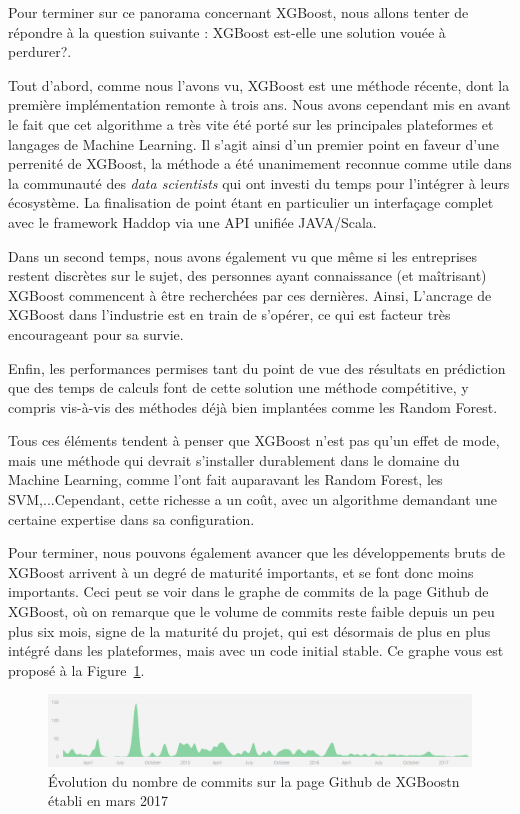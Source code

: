 Pour terminer sur ce panorama concernant XGBoost, nous allons tenter de répondre à la question suivante : \og XGBoost est-elle une solution vouée à perdurer?\fg.

Tout d'abord, comme nous l'avons vu, XGBoost est une méthode récente, dont la première implémentation remonte à trois ans. Nous avons cependant mis en avant le fait que cet algorithme a très vite été porté sur les principales plateformes et langages de Machine Learning. Il s'agit ainsi d'un premier point en faveur d'une perrenité de XGBoost, la méthode a été unanimement reconnue comme utile dans la communauté des \textit{data scientists} qui ont investi du temps pour l'intégrer à leurs écosystème. La finalisation de point étant en particulier un interfaçage complet avec le framework Haddop via une API unifiée JAVA/Scala.

Dans un second temps, nous avons également vu que même si les entreprises restent discrètes sur le sujet, des personnes ayant connaissance (et maîtrisant) XGBoost commencent à être recherchées par ces dernières. Ainsi, L'ancrage de XGBoost dans l'industrie est en train de s'opérer, ce qui est facteur très encourageant pour sa survie.

Enfin, les performances permises tant du point de vue des résultats en prédiction que des temps de calculs font de cette solution une méthode compétitive, y compris vis-à-vis des méthodes déjà bien implantées comme les Random Forest.

Tous ces éléments tendent à penser que XGBoost n'est pas qu'un \og effet de mode\fg, mais une méthode qui devrait s'installer durablement dans le domaine du Machine Learning, comme l'ont fait auparavant les Random Forest, les SVM,...Cependant, cette richesse a un coût, avec un algorithme demandant une certaine expertise dans sa configuration.

Pour terminer, nous pouvons également avancer que les développements \og bruts\fg{} de XGBoost arrivent à un degré de maturité importants, et se font donc moins importants. Ceci peut se voir dans le graphe de commits de la page Github de XGBoost, où on remarque que le volume de commits reste faible depuis un peu plus six mois, signe de la maturité du projet, qui est désormais de plus en plus intégré dans les plateformes, mais avec un code initial stable. Ce graphe vous est proposé à la Figure~\ref{fig:graphe-commits}.

\begin{figure}[h]
	\begin{margincap}
		\centering
		\includegraphics[width=\textwidth]{images/graphe-commits}
		\caption{Évolution du nombre de commits sur la page Github de XGBoostn établi en mars 2017}
		\label{fig:graphe-commits}
	\end{margincap}
\end{figure}
